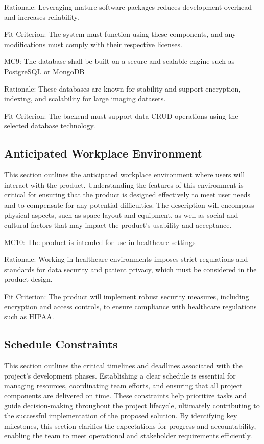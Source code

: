 \documentclass[12pt]{article}
\begin{document}
Rationale: Leveraging mature software packages reduces development overhead and increases reliability.

Fit Criterion: The system must function using these components, and any modifications must comply with their respective licenses.

\indent
MC9: The database shall be built on a secure and scalable engine such as PostgreSQL or MongoDB

Rationale: These databases are known for stability and support encryption, indexing, and scalability for large imaging datasets.

Fit Criterion: The backend must support data CRUD operations using the selected database technology.

\subsection{Anticipated Workplace Environment}
This section outlines the anticipated workplace environment where users will interact with the product. Understanding the features of this environment is critical for ensuring that the product is designed effectively to meet user needs and to compensate for any potential difficulties. The description will encompass physical aspects, such as space layout and equipment, as well as social and cultural factors that may impact the product's usability and acceptance.

\indent
MC10: The product is intended for use in healthcare settings

Rationale: Working in healthcare environments imposes strict regulations and standards for data security and patient privacy, which must be considered in the product design.

Fit Criterion: The product will implement robust security measures, including encryption and access controls, to ensure compliance with healthcare regulations such as HIPAA\cite{hipaa}.

\subsection{Schedule Constraints}
This section outlines the critical timelines and deadlines associated with the project's development phases. Establishing a clear schedule is essential for managing resources, coordinating team efforts, and ensuring that all project components are delivered on time. These constraints help prioritize tasks and guide decision-making throughout the project lifecycle, ultimately contributing to the successful implementation of the proposed solution. By identifying key milestones, this section clarifies the expectations for progress and accountability, enabling the team to meet operational and stakeholder requirements efficiently.
\end{document}
